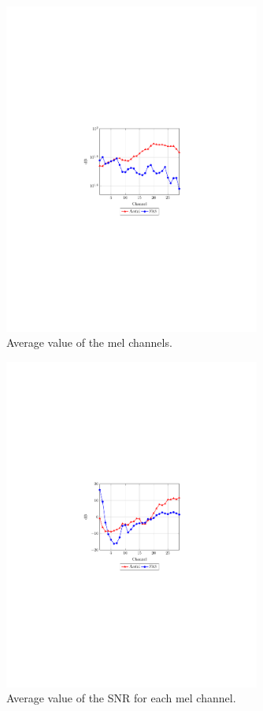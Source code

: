 \begin{figure}[t]
	\centering
	\includegraphics[width=0.75\textwidth]{img/mel_dB}
	\caption{Average value of the mel channels.} \label{fig:mel}
\end{figure}

\begin{figure}[t]
	\centering
	\includegraphics[width=0.75\textwidth]{img/SNR_mel_channel}
	\caption{Average value of the SNR for each mel channel.} \label{fig:noisymel}
\end{figure}


